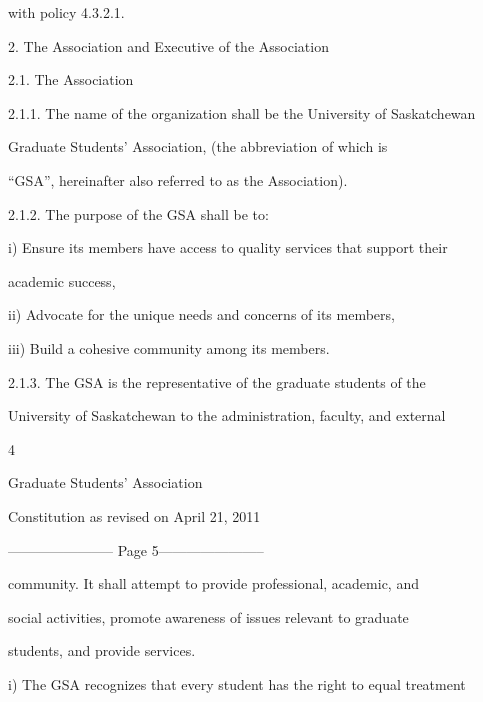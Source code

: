 \documentclass{article}
\begin{document}
with policy 4.3.2.1.  



  



2.  The Association and Executive of the Association  



2.1. The Association  



2.1.1. The name  of the organization  shall be the University  of Saskatchewan  

 Graduate  Students’    Association,    (the    abbreviation    of    which    is   

 “GSA”,   hereinafter   also referred to as the  Association).  



2.1.2. The purpose  of the GSA  shall be to:  



i)      Ensure its members have access to quality services that support their  

 academic success,  



ii)     Advocate for the unique needs and concerns of its members,  



iii)    Build a cohesive community among its members.  



2.1.3. The   GSA   is   the   representative   of   the   graduate   students   of   the  

University of Saskatchewan to the administration, faculty, and external  

   

4  



 Graduate Students’ Association  



    Constitution as revised on April 21, 2011  


----------------------- Page 5-----------------------

community.  It  shall  attempt  to  provide  professional,  academic,  and  

social  activities,  promote  awareness  of  issues  relevant  to  graduate  

students, and provide services.  



i)      The GSA recognizes that every student has the right to equal treatment  
\end{document}
